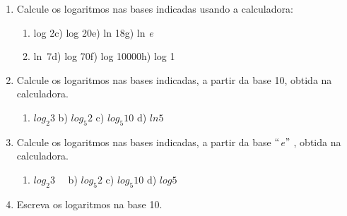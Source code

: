 \documentclass[12pt]{article}
\begin{document}
\begin{enumerate}[label*={\fontsize{14pt}{14pt}\selectfont \textbf{\arabic*.}}]
\begin{enumerate}
\begin{enumerate}
	\item \textit{log 10\tab \tab \tab }c) log 1000\tab \tab e) log 0,00001\par

	\item \textit{log 100000\tab \tab }d) log 10\textsuperscript{10\tab \tab }f) log 0,001\tab 
\end{enumerate}\par


\vspace{\baselineskip}
	\item Calcule os logaritmos nas bases indicadas usando a calculadora:\par

\begin{enumerate}
	\item log 2\tab \tab c) log 20\tab e) ln 18\tab g) ln \textit{e}\par

	\item ln\  7\tab \tab d) log 70\tab f) log 10000\tab h) log 1
\end{enumerate}\par


\vspace{\baselineskip}
	\item Calcule os logaritmos nas bases indicadas, a partir da base 10, obtida na calculadora.\par

\begin{enumerate}
	\item  \( log_{2}3 \) \tab \tab b)  \( log_{5}2 \) \tab c)  \( log_{5}10 \) \tab d)  \( ln5 \) 
\end{enumerate}\par


\vspace{\baselineskip}
	\item Calcule os logaritmos nas bases indicadas, a partir da base $``$\textit{e}$"$ , obtida na calculadora.\par

\begin{enumerate}
	\item  \( log_{2}3 \) \ \  \tab \tab b)  \( log_{5}2 \) \tab c)  \( log_{5}10 \) \tab d)  \( log5 \) 
\end{enumerate}\par


\vspace{\baselineskip}
	\item Escreva os logaritmos na base 10. \par


\end{enumerate}
\end{enumerate}
\end{document}
